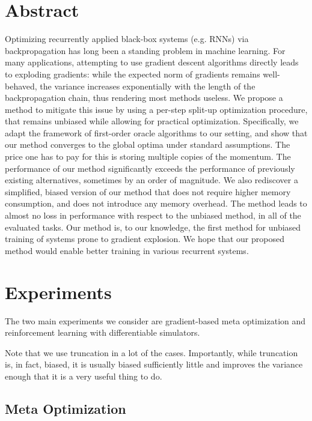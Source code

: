 \documentclass{article}
\begin{document}
\section{Abstract}

Optimizing recurrently applied black-box systems (e.g. RNNs) via backpropagation has long been a standing problem in machine learning. 
For many applications, attempting to use gradient descent algorithms directly leads to exploding gradients: while the expected norm of gradients remains well-behaved, the variance increases exponentially with the length of the backpropagation chain, thus rendering most methods useless.
We propose a method to mitigate this issue by using a per-step split-up optimization procedure, that remains unbiased while allowing for practical optimization.
Specifically, we adapt the framework of first-order oracle algorithms to our setting, and show that our method converges to the global optima under standard assumptions. The price one has to pay for this is storing multiple copies of the momentum.
The performance of our method significantly exceeds the performance of previously existing alternatives, sometimes by an order of magnitude.
We also rediscover a simplified, biased version of our method that does not require higher memory consumption, and does not introduce any memory overhead. The method leads to almost no loss in performance with respect to the unbiased method, in all of the evaluated tasks.
Our method is, to our knowledge, the first method for unbiased training of systems prone to gradient explosion.
We hope that our proposed method would enable better training in various recurrent systems.


\section{Experiments}

The two main experiments we consider are gradient-based meta optimization and reinforcement learning with differentiable simulators.

Note that we use truncation in a lot of the cases. Importantly, while truncation is, in fact, biased, it is usually biased sufficiently little and improves the variance enough that it is a very useful thing to do.

\subsection{Meta Optimization}
\end{document}

